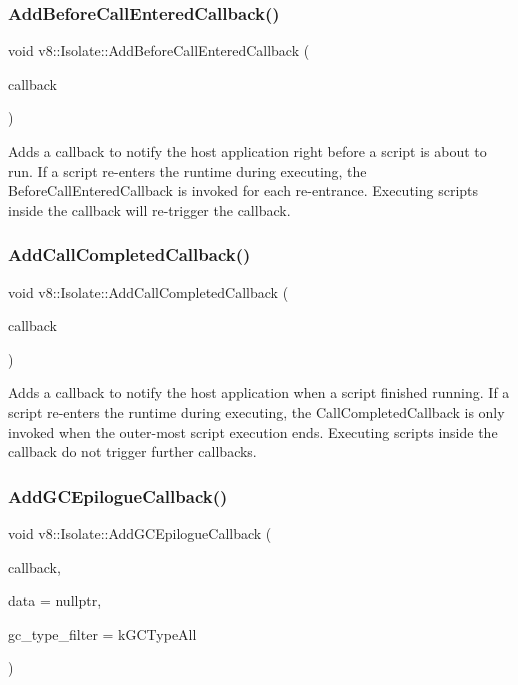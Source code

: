 \subsubsection{\texorpdfstring{Add\+Before\+Call\+Entered\+Callback()}{AddBeforeCallEnteredCallback()}}
{\footnotesize\ttfamily void v8\+::\+Isolate\+::\+Add\+Before\+Call\+Entered\+Callback (\begin{DoxyParamCaption}\item[{Before\+Call\+Entered\+Callback}]{callback }\end{DoxyParamCaption})}

Adds a callback to notify the host application right before a script is about to run. If a script re-\/enters the runtime during executing, the Before\+Call\+Entered\+Callback is invoked for each re-\/entrance. Executing scripts inside the callback will re-\/trigger the callback. \mbox{\label{classv8_1_1Isolate_a89656ac26d523c31fbfdbb12fb32f078}} 
\subsubsection{\texorpdfstring{Add\+Call\+Completed\+Callback()}{AddCallCompletedCallback()}}
{\footnotesize\ttfamily void v8\+::\+Isolate\+::\+Add\+Call\+Completed\+Callback (\begin{DoxyParamCaption}\item[{Call\+Completed\+Callback}]{callback }\end{DoxyParamCaption})}

Adds a callback to notify the host application when a script finished running. If a script re-\/enters the runtime during executing, the Call\+Completed\+Callback is only invoked when the outer-\/most script execution ends. Executing scripts inside the callback do not trigger further callbacks. \mbox{\label{classv8_1_1Isolate_a9a8bad47ce2ded323ff62cdf0677e142}} 
\subsubsection{\texorpdfstring{Add\+G\+C\+Epilogue\+Callback()}{AddGCEpilogueCallback()}}
{\footnotesize\ttfamily void v8\+::\+Isolate\+::\+Add\+G\+C\+Epilogue\+Callback (\begin{DoxyParamCaption}\item[{G\+C\+Callback\+With\+Data}]{callback,  }\item[{void $\ast$}]{data = {\ttfamily nullptr},  }\item[{\mbox{\hyperlink{namespacev8_ac109d6f27e0c0f9ef4e98bcf7a806cf2}{G\+C\+Type}}}]{gc\+\_\+type\+\_\+filter = {\ttfamily kGCTypeAll} }\end{DoxyParamCaption})}


